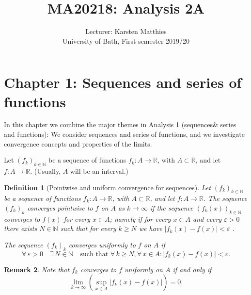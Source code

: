\documentclass[a4paper,reqno]{amsart}
\numberwithin{equation}{section}
\newtheorem{definition}{Definition}[section]
\newtheorem{remark}[definition]{Remark}
\def\N{\mathbb{N}}
\def\R{\mathbb{R}}
\begin{document}
\title[MA20218: Analysis 2A]{MA20218:  Analysis  2A}
\author[]{Lecturer: Karsten Matthies\\University of  Bath, First semester 2019/20 }

\maketitle

\tableofcontents
\thispagestyle{empty}
\newpage
\setcounter{page}{1}


\newpage




\section{Chapter 1: Sequences and series of functions}
In this chapter we combine the major themes in Analysis 1 (sequences\& series and functions): We consider sequences and series of functions, and we investigate convergence concepts and properties of the limits.
\medskip

\noindent
Let $(f_k)_{k\in \mathbb{N}}$ be a sequence of functions $f_k:A \to \R$, with $A\subset \R$, and let $f:A \to \R$. (Usually, $A$ will be an interval.)

\begin{definition}[Pointwise and uniform convergence for sequences]\label{pu-conv}
  Let $(f_k)_{k\in \mathbb{N}}$ be a sequence of functions $f_k:A \to \R$, with $A\subset \R$, and let $f:A \to \R$. The sequence $(f_k)_k$ converges pointwise to $f$ on $A$ as $k\to \infty$ if the sequence $(f_k(x))_{k\in \N}$ converges to $f(x)$ for every $x\in A$; namely if for every $x\in A$ and every $\varepsilon>0$ there exists $N\in \mathbb{N}$ such that for every $k\geq N$ we have $|f_k (x) - f (x)| < \varepsilon$ .

\medskip

The sequence $(f_k)_k$ converges uniformly to $f$ on $A$ if
$$
\forall \,\varepsilon>0 \quad \exists\, N\in \mathbb{N} \quad \textrm{such that } \forall \,k\geq N, \forall\, x\in A: |f_k (x) - f (x)| < \varepsilon.
$$
\end{definition}


\begin{remark}
Note that $f_k$ converges to $f$ uniformly on $A$ if and only if
$$
\lim_{k\to \infty} \left(\sup_{x\in A} |f_k(x)-f(x)|\right)=0.
$$
\end{remark}
\end{document}
